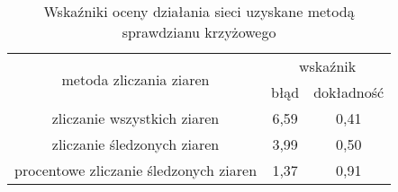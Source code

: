 \begin{table}[htbp]
	\centering
	\begin{tabular}{c|c|c}
	\toprule
	\multirow{2}{*}{metoda zliczania ziaren} & \multicolumn{2}{c}{wskaźnik} \\ 
                                         & błąd       & dokładność      \\ \midrule
zliczanie wszystkich ziaren              & 6,59       & 0,41            \\
zliczanie śledzonych ziaren              & 3,99       & 0,50             \\
procentowe zliczanie śledzonych ziaren   & 1,37       & 0,91          \\   
	\bottomrule
	\end{tabular}
\caption{Wskaźniki oceny działania sieci uzyskane metodą sprawdzianu
         krzyżowego}
\label{tab:blobtest}
\end{table}





